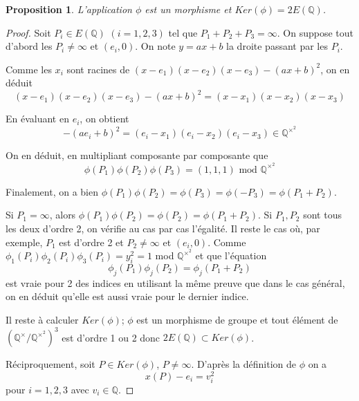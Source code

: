 \documentclass{article}
\newtheorem{proposition}{Proposition}
\begin{document}
\begin{proposition}
L'application $\phi$ est un morphisme et $Ker(\phi) = 2E(\mathbb{Q})$.
\end{proposition}

\begin{proof}
Soit $P_{i} \in E(\mathbb{Q})$ $(i = 1,2,3)$ tel que $P_{1} + P_{2} + P_{3} = \infty$. On suppose tout d'abord les
$P_{i} \neq \infty$ et $(e_{i}, 0)$. On note $y=ax+b$ la droite passant par les $P_{i}$. 

Comme les $x_{i}$ sont racines de $(x-e_{1})(x-e_{2})(x-e_{3})-(ax+b)^2$, on en déduit
\begin{equation*}
(x-e_{1})(x-e_{2})(x-e_{3}) - (ax+b)^2 = (x-x_{1})(x-x_{2})(x-x_{3})
\end{equation*}

En évaluant en $e_{i}$, on obtient
\begin{equation*}
-(ae_{i}+b)^2 = (e_{i}-x_{1})(e_{i}-x_{2})(e_{i}-x_{3}) \in \mathbb{Q}^{\times^2}
\end{equation*}

On en déduit, en multipliant composante par composante que
\begin{equation*}
\phi(P_{1})\phi(P_{2})\phi(P_{3}) = (1, 1, 1) \text{ mod } \mathbb{Q}^{\times^2}
\end{equation*}

Finalement, on a bien $\phi(P_{1})\phi(P_{2}) = \phi(P_{3}) = \phi(-P_{3}) = \phi(P_{1}+P_{2})$.

Si $P_{1} = \infty$, alors $\phi(P_{1})\phi(P_{2}) = \phi(P_{2}) = \phi(P_{1}+P_{2})$. 
Si $P_{1},P_{2}$ sont tous les deux d'ordre 2, on vérifie au cas par cas l'égalité. 
Il reste le cas où, par exemple, $P_{1}$ est d'ordre 2 et $P_{2} \neq \infty$ et $(e_{i}, 0)$. Comme 
$\phi_{1}(P_{i})\phi_{2}(P_{i})\phi_{3}(P_{i}) = y_{i}^2 = 1$ mod $\mathbb{Q}^{\times^2}$ et que l'équation
\begin{equation*}
\phi_{j}(P_{1})\phi_{j}(P_{2}) = \phi_{j}(P_{1}+P_{2})
\end{equation*}
est vraie pour 2 des indices en utilisant la même preuve que dans le cas général, 
on en déduit qu'elle est aussi vraie pour le dernier indice.

Il reste à calculer $Ker(\phi)$; $\phi$ est un morphisme de groupe et tout élément de 
$(\mathbb{Q}^{\times}/\mathbb{Q}^{\times^2})^3$ est d'ordre 1 ou 2 donc $2E(\mathbb{Q}) \subset Ker(\phi)$.

Réciproquement, soit $P \in Ker(\phi)$, $P \neq \infty$. D'après la définition de $\phi$ on a
\begin{equation*}
x(P) - e_{i} = v_{i}^2
\end{equation*}
pour $i=1,2,3$ avec $v_{i} \in \mathbb{Q}$. 


\end{proof}
\end{document}
